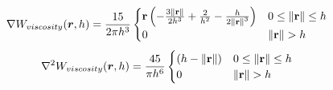 \begin{equation}
\nabla W_{viscosity}(\boldsymbol{r}, h) = {15 \over 2 \pi h^3}
\begin{cases}
\mathbf{r} \left( -{ 3{\| \mathbf{r} \|} \over 2 h^3 } + { 2 \over h^2 } - { h \over 2 {\| \mathbf{r} \|}^3 } \right) & 0 \le \| \mathbf{r} \| \le h \\
0 & \| \mathbf{r} \| > h
\end{cases}
\end{equation}
\begin{equation}
\nabla^2 W_{viscosity}(\boldsymbol{r}, h) = {45 \over \pi h^6}
\begin{cases}
\left( h - {\| \mathbf{r} \|} \right) & 0 \le \| \mathbf{r} \| \le h \\
0 & \| \mathbf{r} \| > h
\end{cases}
\end{equation}
\par

\paragraph{}

\par
